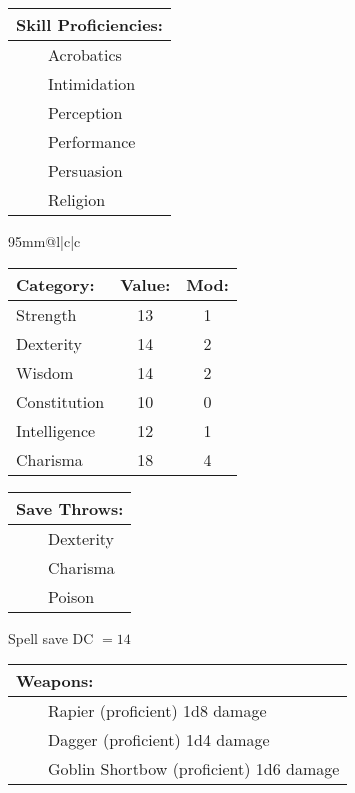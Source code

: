 \documentclass[11pt]{article}
\newcommand{\tabitem}{~~\llap{--}~~}
\begin{document}
\begin{multicols}{2}
\vspace{2mm}

\noindent \begin{tabularx}{95mm}{@{}l}
{\Large \textbf{Skill Proficiencies:}} \\
\hline
\tabitem Acrobatics 	\\
\tabitem Intimidation	\\
\tabitem Perception		\\
\tabitem Performance	\\
\tabitem Persuasion		\\
\tabitem Religion
		\end{tabularx}

\vspace{2mm}

\noindent \begin{tabularx}{95mm}{@{}l|c|c}
 \\
\hline
		\end{tabularx}
\noindent \begin{tabular}{@{}l|c|c}
\textbf{Category:} 			& \textbf{Value:} 	& \textbf{Mod:} \\
\hline
Strength 					& 13 				& 1		\\
Dexterity 					& 14 				& 2		\\
Wisdom 						& 14				& 2		\\
Constitution 				& 10 				& 0		\\
Intelligence 				& 12 				& 1		\\
Charisma 					& 18 				& 4
		\end{tabular}

\vspace{2mm}

\noindent \begin{tabularx}{95mm}{@{}l}
{\Large \textbf{Save Throws:}} \\
\hline
\tabitem Dexterity \\
\tabitem Charisma \\
\tabitem Poison
		\end{tabularx}
\noindent Spell save DC $= 14$

\vspace{2mm}

\noindent \begin{tabularx}{95mm}{@{}l}
{\Large \textbf{Weapons:}} \\
\hline
\tabitem Rapier (proficient) 1d8 damage \\
\tabitem Dagger (proficient) 1d4 damage \\
\tabitem Goblin Shortbow (proficient) 1d6 damage
		\end{tabularx}


\end{multicols}
\end{document}
